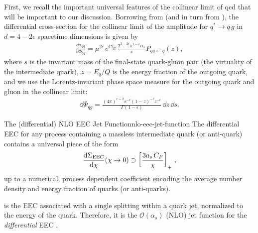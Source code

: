 First, we recall the important universal features of the collinear limit of \gls{qcd} that will be important to our discussion.
%
Borrowing from  (and in turn from \cite{Altarelli:1977zs,PhysRevD.9.980,PhysRevD.46.1980,Ritzmann:2014mka}), the differential cross-section for the collinear limit of the amplitude for \(q^* \to q\,g\) in \(d = 4 - 2\epsilon\) spacetime dimensions is given by
\begin{align}
    \label{eq:collinear_xsec}
    \frac{\dd \sigma_{qg}}{\dd \Phi_{qg}}
    =
    \mu^{2\epsilon}\,
    e^{\epsilon \gamma_E}
    \,
    \frac{2^{3-2\epsilon} \pi^{1-\epsilon}  \alpha_s}{s} P_{qg\leftarrow q}(z)
    ,
\end{align}
where \(s\) is the invariant mass of the final-state quark-gluon pair (the virtuality of the intermediate quark), \(z = E_q/Q\) is the energy fraction of the outgoing quark, and we use the Lorentz-invariant phase space measure for the outgoing quark and gluon in the collinear limit:
\begin{align}
    \label{eq:collinear_phase_space}
    \dd \Phi_{qg}
    =
    \frac{
        {(4\pi)}^{\epsilon-2}
        s^{-\epsilon}
        {(1-z)}^{-\epsilon} z^{-\epsilon}
    }
    {\Gamma(1-\epsilon)}
    \,
    \dd z \, \dd s
    .
\end{align}


\begin{proposition}{The (differential) NLO EEC Jet Function}{nlo-eec-jet-function}
The differential EEC for any process containing a massless intermediate quark (or anti-quark) contains a universal piece of the form
\begin{align}
    \label{eq:universal_differential_eec_prop}
    \frac{\dd \Sigma_\text{EEC}}{\dd \chi}
    (\chi \to 0)
    \supset
    \le[
    \frac{3\ascf}{\chi}
    \ri]_+
    \,,
\end{align}
up to a numerical, process dependent coefficient encoding the average number density and energy fraction of quarks (or anti-quarks).

 is the EEC associated with a single splitting within a quark jet, normalized to the energy of the quark.
%
Therefore, it is the \(\mathcal{O}(\alpha_s)\) (NLO) jet function for the \textit{differential} EEC \cite{Dixon:2019uzg}.
\end{proposition}



